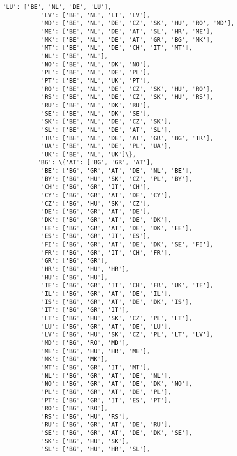 \documentclass[11pt]{article}
\begin{document}
\begin{Verbatim}[commandchars=\\\{\}]
           'LU': ['BE', 'NL', 'DE', 'LU'],
           'LV': ['BE', 'NL', 'LT', 'LV'],
           'MD': ['BE', 'NL', 'DE', 'CZ', 'SK', 'HU', 'RO', 'MD'],
           'ME': ['BE', 'NL', 'DE', 'AT', 'SL', 'HR', 'ME'],
           'MK': ['BE', 'NL', 'DE', 'AT', 'GR', 'BG', 'MK'],
           'MT': ['BE', 'NL', 'DE', 'CH', 'IT', 'MT'],
           'NL': ['BE', 'NL'],
           'NO': ['BE', 'NL', 'DK', 'NO'],
           'PL': ['BE', 'NL', 'DE', 'PL'],
           'PT': ['BE', 'NL', 'UK', 'PT'],
           'RO': ['BE', 'NL', 'DE', 'CZ', 'SK', 'HU', 'RO'],
           'RS': ['BE', 'NL', 'DE', 'CZ', 'SK', 'HU', 'RS'],
           'RU': ['BE', 'NL', 'DK', 'RU'],
           'SE': ['BE', 'NL', 'DK', 'SE'],
           'SK': ['BE', 'NL', 'DE', 'CZ', 'SK'],
           'SL': ['BE', 'NL', 'DE', 'AT', 'SL'],
           'TR': ['BE', 'NL', 'DE', 'AT', 'GR', 'BG', 'TR'],
           'UA': ['BE', 'NL', 'DE', 'PL', 'UA'],
           'UK': ['BE', 'NL', 'UK']\},
          'BG': \{'AT': ['BG', 'GR', 'AT'],
           'BE': ['BG', 'GR', 'AT', 'DE', 'NL', 'BE'],
           'BY': ['BG', 'HU', 'SK', 'CZ', 'PL', 'BY'],
           'CH': ['BG', 'GR', 'IT', 'CH'],
           'CY': ['BG', 'GR', 'AT', 'DE', 'CY'],
           'CZ': ['BG', 'HU', 'SK', 'CZ'],
           'DE': ['BG', 'GR', 'AT', 'DE'],
           'DK': ['BG', 'GR', 'AT', 'DE', 'DK'],
           'EE': ['BG', 'GR', 'AT', 'DE', 'DK', 'EE'],
           'ES': ['BG', 'GR', 'IT', 'ES'],
           'FI': ['BG', 'GR', 'AT', 'DE', 'DK', 'SE', 'FI'],
           'FR': ['BG', 'GR', 'IT', 'CH', 'FR'],
           'GR': ['BG', 'GR'],
           'HR': ['BG', 'HU', 'HR'],
           'HU': ['BG', 'HU'],
           'IE': ['BG', 'GR', 'IT', 'CH', 'FR', 'UK', 'IE'],
           'IL': ['BG', 'GR', 'AT', 'DE', 'IL'],
           'IS': ['BG', 'GR', 'AT', 'DE', 'DK', 'IS'],
           'IT': ['BG', 'GR', 'IT'],
           'LT': ['BG', 'HU', 'SK', 'CZ', 'PL', 'LT'],
           'LU': ['BG', 'GR', 'AT', 'DE', 'LU'],
           'LV': ['BG', 'HU', 'SK', 'CZ', 'PL', 'LT', 'LV'],
           'MD': ['BG', 'RO', 'MD'],
           'ME': ['BG', 'HU', 'HR', 'ME'],
           'MK': ['BG', 'MK'],
           'MT': ['BG', 'GR', 'IT', 'MT'],
           'NL': ['BG', 'GR', 'AT', 'DE', 'NL'],
           'NO': ['BG', 'GR', 'AT', 'DE', 'DK', 'NO'],
           'PL': ['BG', 'GR', 'AT', 'DE', 'PL'],
           'PT': ['BG', 'GR', 'IT', 'ES', 'PT'],
           'RO': ['BG', 'RO'],
           'RS': ['BG', 'HU', 'RS'],
           'RU': ['BG', 'GR', 'AT', 'DE', 'RU'],
           'SE': ['BG', 'GR', 'AT', 'DE', 'DK', 'SE'],
           'SK': ['BG', 'HU', 'SK'],
           'SL': ['BG', 'HU', 'HR', 'SL'],

\end{Verbatim}
\end{document}
